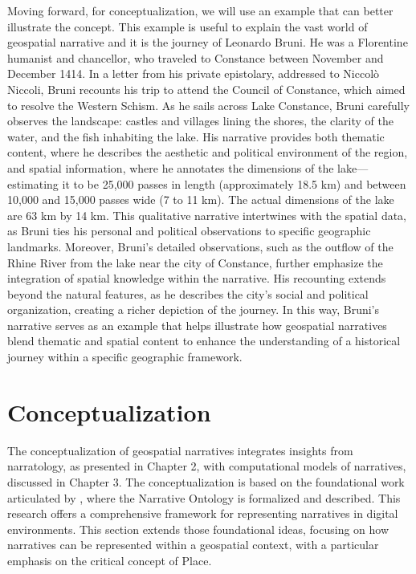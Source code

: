Moving forward, for conceptualization, we will use an example that can better illustrate the concept. This example is useful to explain the vast world of geospatial narrative and it is the journey of Leonardo Bruni. He was a Florentine humanist and chancellor, who traveled to Constance between November and December 1414. In a letter from his private epistolary, addressed to Niccolò Niccoli, Bruni recounts his trip to attend the Council of Constance, which aimed to resolve the Western Schism. As he sails across Lake Constance, Bruni carefully observes the landscape: castles and villages lining the shores, the clarity of the water, and the fish inhabiting the lake. His narrative provides both thematic content, where he describes the aesthetic and political environment of the region, and spatial information, where he annotates the dimensions of the lake—estimating it to be 25,000 passes in length (approximately 18.5 km) and between 10,000 and 15,000 passes wide (7 to 11 km). The actual dimensions of the lake are 63 km by 14 km. This qualitative narrative intertwines with the spatial data, as Bruni ties his personal and political observations to specific geographic landmarks. Moreover, Bruni’s detailed observations, such as the outflow of the Rhine River from the lake near the city of Constance, further emphasize the integration of spatial knowledge within the narrative. His recounting extends beyond the natural features, as he describes the city’s social and political organization, creating a richer depiction of the journey. In this way, Bruni's narrative serves as an example that helps illustrate how geospatial narratives blend thematic and spatial content to enhance the understanding of a historical journey within a specific geographic framework.


\section{Conceptualization}\label{V-sec:conceptualization}

The conceptualization of geospatial narratives integrates insights from narratology, as presented in Chapter 2, with computational models of narratives, discussed in Chapter 3. The conceptualization is based on the foundational work articulated by \cite{meghiniRepresentingNarrativesDigital2021}, where the Narrative Ontology is formalized and described. This research offers a comprehensive framework for representing narratives in digital environments. This section extends those foundational ideas, focusing on how narratives can be represented within a geospatial context, with a particular emphasis on the critical concept of Place.

